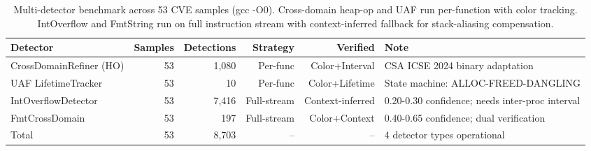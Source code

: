 \begin{table}[htbp]
\centering
\caption{Multi-detector benchmark across 53 CVE samples (gcc -O0). Cross-domain heap-op and UAF run per-function with color tracking. IntOverflow and FmtString run on full instruction stream with context-inferred fallback for stack-aliasing compensation.}
\label{tab:final}
\begin{tabular}{lrrrrl}
\toprule
Detector & Samples & Detections & Strategy & Verified & Note \\
\midrule
CrossDomainRefiner (HO) & 53 & 1,080 & Per-func & Color+Interval & CSA ICSE 2024 binary adaptation \\
UAF LifetimeTracker & 53 & 10 & Per-func & Color+Lifetime & State machine: ALLOC-FREED-DANGLING \\
IntOverflowDetector & 53 & 7,416 & Full-stream & Context-inferred & 0.20-0.30 confidence; needs inter-proc interval \\
FmtCrossDomain & 53 & 197 & Full-stream & Color+Context & 0.40-0.65 confidence; dual verification \\
\midrule
Total & 53 & 8,703 & -- & -- & 4 detector types operational \\
\bottomrule
\end{tabular}
\end{table}
